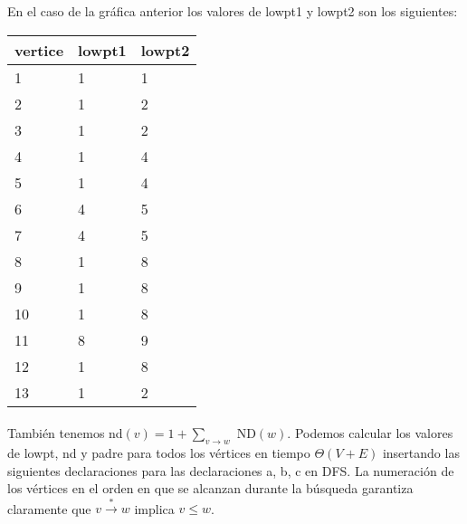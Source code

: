 En el caso de la gráfica anterior los valores de lowpt1 y lowpt2 son los siguientes:\\
\begin{center}
\begin{tabular}{lll}
\toprule
vertice & lowpt1 & lowpt2 \\
\midrule
      1 &      1 &      1 \\
      2 &      1 &      2 \\
      3 &      1 &      2 \\
      4 &      1 &      4 \\
      5 &      1 &      4 \\
      6 &      4 &      5 \\
      7 &      4 &      5 \\
      8 &      1 &      8 \\
      9 &      1 &      8 \\
     10 &      1 &      8 \\
     11 &      8 &      9 \\
     12 &      1 &      8 \\
     13 &      1 &      2 \\
\bottomrule
\end{tabular}
\end{center}

\paragraph{}
También tenemos nd$\left(v\right)= 1 + \sum_{v \rightarrow w} $ ND$\left(w\right)$. Podemos calcular los valores de lowpt, nd y padre para todos los vértices en tiempo $\Theta\left(V + E\right)$ insertando las siguientes declaraciones para las declaraciones a, b, c en DFS. La numeración de los vértices en el orden en que se alcanzan durante la búsqueda garantiza claramente que $v \overset{\ast}{\rightarrow} w$ implica $v \le w$.


